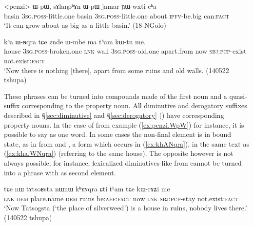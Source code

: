 \begin{exe}
\ex \label{ex:penzi.WpW}
 \gll <penzi> ɯ-pɯ, sɤlaŋpʰɤn ɯ-pɯ jamar ɲɯ-wxti cʰa \\
 basin \textsc{3sg}.\textsc{poss}-little.one  basin \textsc{3sg}.\textsc{poss}-little.one about \textsc{ipfv}-be.big can:\textsc{fact} \\
 \glt `It can grow about as big as a little basin.' (18-NGolo)
\end{exe}

\begin{exe}
\ex \label{ex:kha.WNqra}
 \gll kʰa ɯ-ɴqra tɕe znde ɯ-mbe ma tʰam kɯ-tu me. \\
house \textsc{3sg}.\textsc{poss}-broken.one \textsc{lnk} wall \textsc{3sg}.\textsc{poss}-old.one apart.from now \textsc{sbj}:\textsc{pcp}-exist not.exist:\textsc{fact} \\ 
\glt `Now there is nothing [there], apart from some ruins and old walls. (140522 tshupa)
\end{exe}

These phrases can be turned into compounds made of the first noun and a quasi-suffix corresponding to the property noun. All diminutive and derogatory suffixes described in §\ref{sec:diminutive} and §\ref{sec:derogatory} () have corresponding property nouns. In the case of  from example (\ref{ex:penzi.WpW}) for instance, it is possible to say  as one word. In some cases the non-final element is in bound state, as in  from  and , a form which occurs in (\ref{ex:khANqra}), in the same text as (\ref{ex:kha.WNqra}) (referring to the same house). The opposite however is not always possible; for instance, lexicalized diminutives like  from  cannot be turned into a phrase with  as second element.

\begin{exe}
\ex \label{ex:khANqra}
 \gll tɕe nɯ tɤtsoʁsta nɯnɯ kʰɤɴqra ɕti tʰam tɕe kɯ-rɤʑi me \\
\textsc{lnk} \textsc{dem} place.name \textsc{dem} ruins be:\textsc{aff}:\textsc{fact} now \textsc{lnk} \textsc{sbj}:\textsc{pcp}-stay not.exist:\textsc{fact} \\
\glt `Now Tatsogsta (`the place of silverweed') is a house in ruins, nobody lives there.' (140522 tshupa)
\end{exe}

